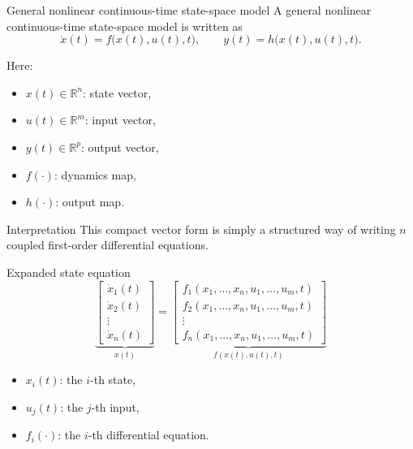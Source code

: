 \documentclass[aspectratio=169,10pt]{beamer}
\newcommand{\R}{\mathbb{R}}
\begin{document}
\begin{frame}{General nonlinear continuous-time state-space model}
A general nonlinear continuous-time state-space model is written as
\[
\dot{x}(t)=f\big(x(t),u(t),t\big),
\qquad
y(t)=h\big(x(t),u(t),t\big).
\]

Here:
\begin{itemize}
  \item \(x(t)\in\R^n\): state vector,
  \item \(u(t)\in\R^m\): input vector,
  \item \(y(t)\in\R^p\): output vector,
  \item \(f(\cdot)\): dynamics map,
  \item \(h(\cdot)\): output map.
\end{itemize}

\begin{notebox}{Interpretation}
This compact vector form is simply a structured way of writing \(n\) coupled first-order differential equations.
\end{notebox}
\end{frame}

\begin{frame}{Expanded state equation}
\[
\underbrace{
\begin{bmatrix}
\dot{x}_1(t)\\
\dot{x}_2(t)\\
\vdots\\
\dot{x}_n(t)
\end{bmatrix}}_{\dot{x}(t)}
=
\underbrace{
\begin{bmatrix}
f_1(x_1,\dots,x_n,u_1,\dots,u_m,t)\\
f_2(x_1,\dots,x_n,u_1,\dots,u_m,t)\\
\vdots\\
f_n(x_1,\dots,x_n,u_1,\dots,u_m,t)
\end{bmatrix}}_{f(x(t),u(t),t)}
\]

\begin{itemize}
  \item \(x_i(t)\): the \(i\)-th state,
  \item \(u_j(t)\): the \(j\)-th input,
  \item \(f_i(\cdot)\): the \(i\)-th differential equation.
\end{itemize}
\end{frame}
\end{document}
